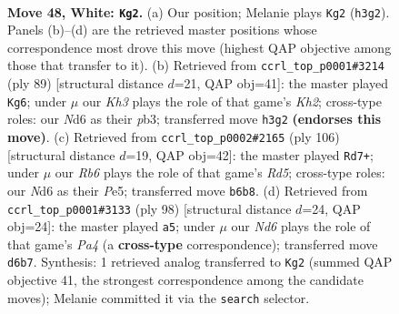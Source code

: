 \documentclass[11pt]{article}
\begin{document}
\clearpage

\begin{figure}[p]\centering
\begin{subfigure}{0.46\textwidth}\centering
\resizebox{\linewidth}{!}{%
\newchessgame
\chessboard[
  setfen={8/6pk/1R1Npp2/7p/1p1P1P1P/2r1P1PK/8/8 w - - 4 48},
  showmover=false,
  pgfstyle=straightmove, color=movearrow, markmove={h3-g2}
]}
\caption{}
\end{subfigure}\hfill
\begin{subfigure}{0.46\textwidth}\centering
\resizebox{\linewidth}{!}{%
\newchessgame
\chessboard[
  setfen={4r3/6pk/1p1RPp1p/p1p5/P5P1/1P5P/6K1/8 b - - 2 45},
  showmover=false,
  pgfstyle=straightmove, color=movearrow, markmove={h7-g6}
]}
\caption{}
\end{subfigure}
\\[4pt]
\begin{subfigure}{0.46\textwidth}\centering
\resizebox{\linewidth}{!}{%
\newchessgame
\chessboard[
  setfen={8/6k1/1p4p1/p2RPp2/P1r2P1p/4PK1P/1P6/8 w - - 6 54},
  showmover=false,
  pgfstyle=straightmove, color=movearrow, markmove={d5-d7}
]}
\caption{}
\end{subfigure}\hfill
\begin{subfigure}{0.46\textwidth}\centering
\resizebox{\linewidth}{!}{%
\newchessgame
\chessboard[
  setfen={8/6k1/R4pp1/4p3/P3P2p/2r2P1P/5KP1/8 w - - 1 50},
  showmover=false,
  pgfstyle=straightmove, color=movearrow, markmove={a4-a5}
]}
\caption{}
\end{subfigure}
\caption{\textbf{Move 48, White: \texttt{Kg2}.} (a) Our position; Melanie plays \texttt{Kg2} (\texttt{h3g2}). Panels (b)--(d) are the retrieved master positions whose correspondence most drove this move (highest QAP objective among those that transfer to it). (b) Retrieved from \texttt{ccrl\_top\_p0001\#3214} (ply 89) [structural distance $d$=21, QAP obj=41]: the master played \texttt{Kg6}; under $\mu$ our \emph{Kh3} plays the role of that game's \emph{Kh2}; cross-type roles: our \emph{N}d6 as their \emph{p}b3; transferred move \texttt{h3g2} \textbf{(endorses this move)}. (c) Retrieved from \texttt{ccrl\_top\_p0002\#2165} (ply 106) [structural distance $d$=19, QAP obj=42]: the master played \texttt{Rd7+}; under $\mu$ our \emph{Rb6} plays the role of that game's \emph{Rd5}; cross-type roles: our \emph{N}d6 as their \emph{P}e5; transferred move \texttt{b6b8}. (d) Retrieved from \texttt{ccrl\_top\_p0001\#3133} (ply 98) [structural distance $d$=24, QAP obj=24]: the master played \texttt{a5}; under $\mu$ our \emph{Nd6} plays the role of that game's \emph{Pa4} (a \textbf{cross-type} correspondence); transferred move \texttt{d6b7}. Synthesis: 1 retrieved analog transferred to \texttt{Kg2} (summed QAP objective 41, the strongest correspondence among the candidate moves); Melanie committed it via the \texttt{search} selector.}
\label{fig:thought-m94}
\end{figure}
\end{document}
